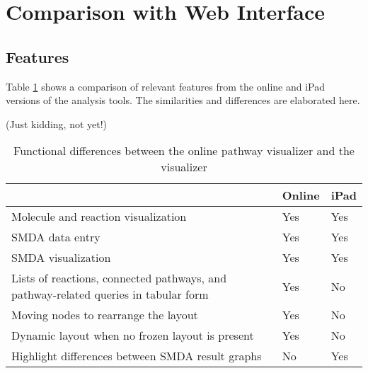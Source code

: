 \section{Comparison with \pathcasemaw Web Interface}
\label{sect:maw_comparison}

\subsection{Features}
\label{sect:maw_comparison_features}

Table \ref{fig:maw_comparison_table} shows a comparison of relevant features
from the online and iPad versions of the \pathcasemaw analysis tools. The
similarities and differences are elaborated here.

(Just kidding, not yet!)

\begin{table}[ht!]
\centering
\begin{tabular}{ | p{3in} | l | l | }
    \hline
                        & Online    & iPad \\ \hline

    Molecule and reaction visualization
                        & Yes       & Yes \\ \hline

    SMDA data entry     & Yes       & Yes \\ \hline

    SMDA visualization  & Yes       & Yes \\ \hline

    Lists of reactions, connected pathways, and pathway-related queries in
    tabular form
                        & Yes       & No \\ \hline

    Moving nodes to rearrange the layout
                        & Yes       & No \\ \hline

    Dynamic layout when no frozen layout is present
                        & Yes       & No \\ \hline

    Highlight differences between SMDA result graphs
                        & No        & Yes \\ \hline
\end{tabular}
    \caption{Functional differences between the online \pathcasemaw pathway
    visualizer and the \mawapp visualizer}
    \label{fig:maw_comparison_table}
\end{table}

